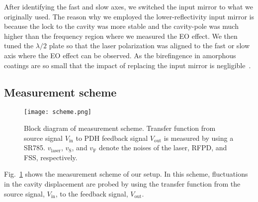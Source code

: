\documentclass[%
 reprint,
 superscriptaddress,
 amsmath,amssymb,
 aps,
]{revtex4-2}
\begin{document}
After identifying the fast and slow axes, we switched the input mirror to what we originally used.
The reason why we employed the lower-reflectivity input mirror is because the lock to the cavity was more stable and the cavity-pole was much higher than the frequency region where we measured the EO effect.
We then tuned the $\lambda/2$ plate so that the laser polarization was aligned to the fast or slow axis where the EO effect can be observed.
As the birefingence in amorphous coatings are so small that the impact of replacing the input mirror is negligible~\cite{Bielsa2009}.


\subsection{Measurement scheme}

\begin{figure}[htbp]
\texttt{[image: scheme.png]}
\caption{Block diagram of measurement scheme. Transfer function from source signal $V_{\mathrm{in}}$ to PDH feedback signal $V_{\mathrm{out}}$ is measured by using a SR785. $v_{\mathrm{laser}}$, $v_{\mathrm{S}}$, and $v_{\mathrm{F}}$ denote the noises of the laser, RFPD, and FSS, respectively.}
\label{fig.scheme}
\end{figure}

Fig.~\ref{fig.scheme} shows the measurement scheme of our setup. 
In this scheme, fluctuations in the cavity displacement are probed by using the transfer function from the source signal, $V_{\mathrm{in}}$, to the feedback signal, $V_{\mathrm{out}}$.

\end{document}
